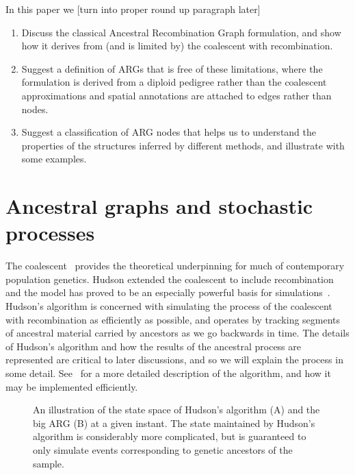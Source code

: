 \documentclass{article}
\begin{document}
In this paper we [turn into proper round up paragraph later]
\begin{enumerate}
\item Discuss the classical Ancestral Recombination Graph formulation,
and show how it derives from (and is limited by) the coalescent with
recombination.
\item Suggest a definition of ARGs that is free of these limitations,
where the formulation is derived from a diploid pedigree rather than
the coalescent approximations and spatial annotations are attached to
edges rather than nodes.
\item Suggest a classification of ARG nodes that helps us to understand
the properties of the structures inferred by different methods, and illustrate
with some examples.
\end{enumerate}

\section*{Ancestral graphs and stochastic processes}
The coalescent~\citep{kingman1982coalescent,kingman1982genealogy,
hudson1983testing, tajima1983evolutionary}
provides the theoretical underpinning for much of contemporary population genetics.
Hudson extended the coalescent to include
recombination~\citep{hudson1983properties,hudson1990gene}
and the model has proved to be an especially powerful basis for
simulations~\citep{hudson2002generating,baumdicker2021efficient}.
Hudson's algorithm is concerned with simulating the process of
the coalescent with recombination as efficiently as possible, and operates by
tracking segments of ancestral material carried by ancestors as
we go backwards in time. The details of Hudson's algorithm and how the
results of the ancestral process are represented are critical to later
discussions, and so we will explain the process in some detail.
See~\cite{kelleher2016efficient} for a more detailed
description of the algorithm, and how it may be implemented efficiently.

\begin{figure}
\caption{\label{fig-sim-statespace} An illustration of the state space
of Hudson's algorithm (A) and the big ARG (B) at a given instant. The
state maintained by Hudson's algorithm is considerably more complicated,
but is guaranteed to only simulate events corresponding to genetic
ancestors of the sample.
}
\end{figure}
\end{document}
